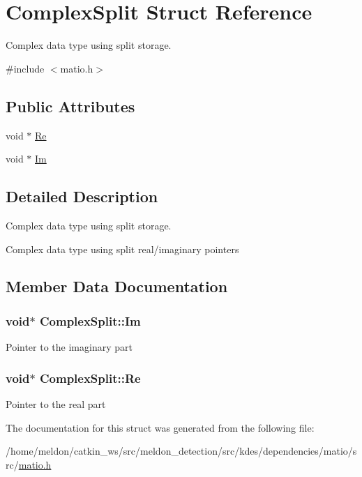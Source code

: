 \hypertarget{structComplexSplit}{\section{Complex\-Split Struct Reference}
\label{structComplexSplit}
}


Complex data type using split storage.  




{\ttfamily \#include $<$matio.\-h$>$}

\subsection*{Public Attributes}
\begin{DoxyCompactItemize}
\item 
void $\ast$ \hyperlink{structComplexSplit_ab9c3f2544c4325a372300d4546e374a8}{Re}
\item 
void $\ast$ \hyperlink{structComplexSplit_abdf9792203bd776fb6be4ceebf078402}{Im}
\end{DoxyCompactItemize}


\subsection{Detailed Description}
Complex data type using split storage. 

Complex data type using split real/imaginary pointers 

\subsection{Member Data Documentation}
\hypertarget{structComplexSplit_abdf9792203bd776fb6be4ceebf078402}{
\subsubsection[{Im}]{\setlength{\rightskip}{0pt plus 5cm}void$\ast$ Complex\-Split\-::\-Im}}\label{structComplexSplit_abdf9792203bd776fb6be4ceebf078402}
Pointer to the imaginary part \hypertarget{structComplexSplit_ab9c3f2544c4325a372300d4546e374a8}{
\subsubsection[{Re}]{\setlength{\rightskip}{0pt plus 5cm}void$\ast$ Complex\-Split\-::\-Re}}\label{structComplexSplit_ab9c3f2544c4325a372300d4546e374a8}
Pointer to the real part 

The documentation for this struct was generated from the following file\-:\begin{DoxyCompactItemize}
\item 
/home/meldon/catkin\-\_\-ws/src/meldon\-\_\-detection/src/kdes/dependencies/matio/src/\hyperlink{matio_8h}{matio.\-h}\end{DoxyCompactItemize}
